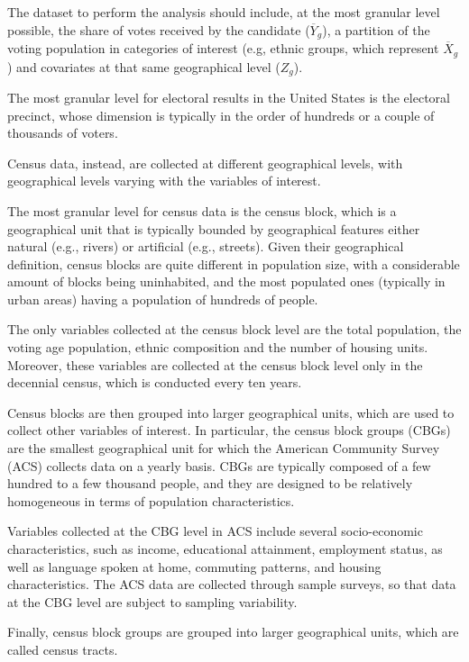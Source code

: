 The dataset to perform the analysis should include, at the most granular level possible, the share of votes received by the candidate ($\overline{Y}_g$), a partition of the voting population in categories of interest (e.g, ethnic groups, which represent $\overline{X}_g$) and covariates at that same geographical level ($Z_g$).

The most granular level for electoral results in the United States is the electoral precinct, whose dimension is typically in the order of hundreds or a couple of thousands of voters.

Census data, instead, are collected at different geographical levels, with geographical levels varying with the variables of interest.

The most granular level for census data is the census block, which is a geographical unit that is typically bounded by geographical features either natural (e.g., rivers) or artificial (e.g., streets). Given their geographical definition, census blocks are quite different in population size, with a considerable amount of blocks being uninhabited, and the most populated ones (typically in urban areas) having a population of hundreds of people.

The only variables collected at the census block level are the total population, the voting age population, ethnic composition and the number of housing units. Moreover, these variables are collected at the census block level only in the decennial census, which is conducted every ten years.

Census blocks are then grouped into larger geographical units, which are used to collect other variables of interest. In particular, the census block groups (CBGs) are the smallest geographical unit for which the American Community Survey (ACS) collects data on a yearly basis. CBGs are typically composed of a few hundred to a few thousand people, and they are designed to be relatively homogeneous in terms of population characteristics.

Variables collected at the CBG level in ACS include several socio-economic characteristics, such as income, educational attainment, employment status, as well as language spoken at home, commuting patterns, and housing characteristics. The ACS data are collected through sample surveys, so that data at the CBG level are subject to sampling variability.

Finally, census block groups are grouped into larger geographical units, which are called census tracts.

